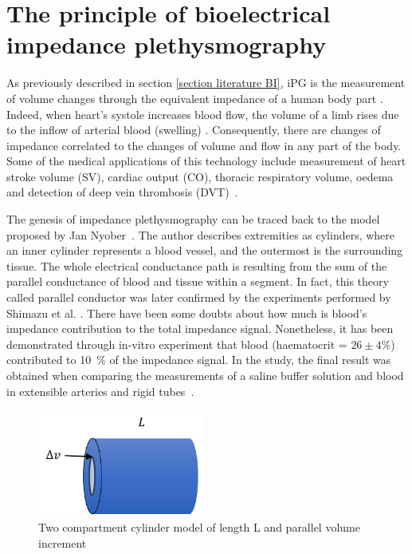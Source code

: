 \section{The principle of bioelectrical impedance plethysmography} 
\label{section iPG principle}
As previously described in section \ref{section literature BI}, iPG is the measurement of volume changes through the equivalent impedance of a human body part \cite{corciova2011peripheral}. Indeed, when heart’s systole increases blood flow, the volume of a limb rises due to the inflow of arterial blood (swelling) \cite{martinsen2011bioimpedance}. Consequently, there are changes of impedance correlated to the changes of volume and flow in any part of the body. Some of the medical applications of this technology include measurement of heart stroke volume (SV), cardiac output (CO), thoracic respiratory volume, oedema and detection of deep vein thrombosis (DVT)~\cite{holohan1996plethysmography}.  

The genesis of impedance plethysmography can be traced back to the model proposed by Jan Nyober~\cite{nyober1950electrical}. The author describes extremities as cylinders, where an inner cylinder represents a blood vessel, and the outermost is the surrounding tissue. The whole electrical conductance path is resulting from the sum of the parallel conductance of blood and tissue within a segment. In fact, this theory called parallel conductor was later confirmed by the experiments performed by Shimazu et al. \cite{shimazu1982evaluation}. There have been some doubts about how much is blood's impedance contribution to the total impedance signal. Nonetheless, it has been demonstrated through in-vitro experiment that blood (haematocrit = $ 26 \pm 4 \%$) contributed to \SI{10}{\percent} of the impedance signal. In the study, the final result was obtained when comparing the measurements of a saline buffer solution and blood in extensible arteries and rigid tubes~\cite{peura1978influence}.

\begin{figure}[!htpb]
	\centering
	\includegraphics[width=5.5cm,keepaspectratio]{figure5}    
	\caption[Two compartment cylinder model]{Two compartment cylinder model of length L and parallel volume increment}
	\label{fig:two cylinder model}
\end{figure} 

